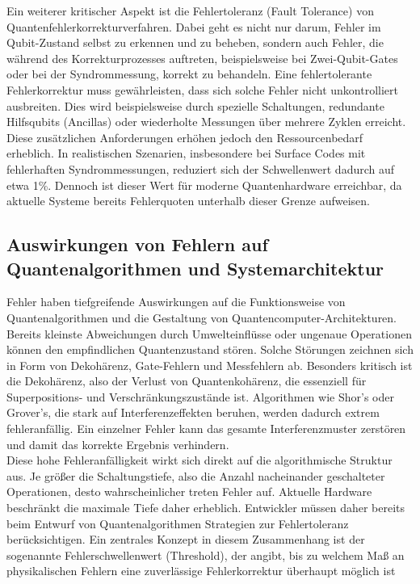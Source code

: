Ein weiterer kritischer Aspekt ist die Fehlertoleranz (Fault Tolerance) von Quantenfehlerkorrekturverfahren. Dabei geht es nicht nur darum, Fehler im Qubit-Zustand selbst zu erkennen und zu beheben, sondern auch Fehler, die während des Korrekturprozesses auftreten, beispielsweise bei Zwei-Qubit-Gates oder bei der Syndrommessung, korrekt zu behandeln. Eine fehlertolerante Fehlerkorrektur muss gewährleisten, dass sich solche Fehler nicht unkontrolliert ausbreiten. Dies wird beispielsweise durch spezielle Schaltungen, redundante Hilfsqubits (Ancillas) oder wiederholte Messungen über mehrere Zyklen erreicht. Diese zusätzlichen Anforderungen erhöhen jedoch den Ressourcenbedarf erheblich. In realistischen Szenarien, insbesondere bei Surface Codes mit fehlerhaften Syndrommessungen, reduziert sich der Schwellenwert dadurch auf etwa 1\%. Dennoch ist dieser Wert für moderne Quantenhardware erreichbar, da aktuelle Systeme bereits Fehlerquoten unterhalb dieser Grenze aufweisen. \cite[Seite 13-15]{roffe_quantum_2019} \\

\subsection{Auswirkungen von Fehlern auf Quantenalgorithmen und Systemarchitektur}
Fehler haben tiefgreifende Auswirkungen auf die Funktionsweise von Quantenalgorithmen und die Gestaltung von Quantencomputer-Architekturen. Bereits kleinste Abweichungen durch Umwelteinflüsse oder ungenaue Operationen können den empfindlichen Quantenzustand stören. Solche Störungen zeichnen sich in Form von Dekohärenz, Gate-Fehlern und Messfehlern ab. Besonders kritisch ist die Dekohärenz, also der Verlust von Quantenkohärenz, die essenziell für Superpositions- und Verschränkungszustände ist. Algorithmen wie Shor’s oder Grover’s, die stark auf Interferenzeffekten beruhen, werden dadurch extrem fehleranfällig. Ein einzelner Fehler kann das gesamte Interferenzmuster zerstören und damit das korrekte Ergebnis verhindern. \cite[Seite 381-385]{nielsen_quantum_2010}\\

Diese hohe Fehleranfälligkeit wirkt sich direkt auf die algorithmische Struktur aus. Je größer die Schaltungstiefe, also die Anzahl nacheinander geschalteter Operationen, desto wahrscheinlicher treten Fehler auf. Aktuelle Hardware beschränkt die maximale Tiefe daher erheblich. Entwickler müssen daher bereits beim Entwurf von Quantenalgorithmen Strategien zur Fehlertoleranz berücksichtigen. Ein zentrales Konzept in diesem Zusammenhang ist der sogenannte Fehlerschwellenwert (Threshold), der angibt, bis zu welchem Maß an physikalischen Fehlern eine zuverlässige Fehlerkorrektur überhaupt möglich ist  \cite[Seite 293-308]{rieffelQuantumComputingGentle2011a}\\

